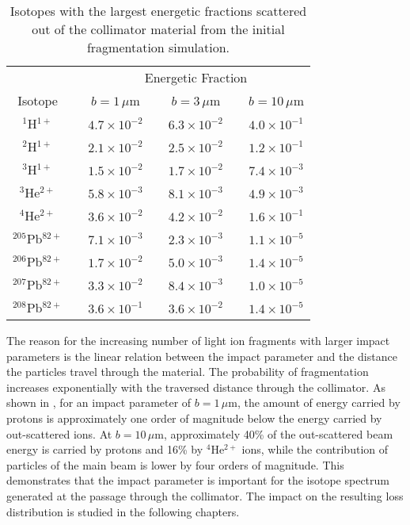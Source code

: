 %
%
\begin{table}[b]
\centering
\caption{Isotopes with the largest energetic fractions scattered out of the collimator material from the initial fragmentation simulation. }
\small
\setlength\tabcolsep{2.5pt}
\label{tab:importance}
\begin{tabular}{ccccccc}
\toprule
          \multicolumn{1}{c}{}     &     &  \multicolumn{5}{c}{Energetic Fraction}                    \\

\multicolumn{1}{c}{Isotope}       &   & \multicolumn{1}{c}{$b=1\,\mu$m} &            & \multicolumn{1}{c}{$b=3\,\mu$m}      &       & \multicolumn{1}{c}{$b=10\,\mu$m}            \\ \midrule
$^1$H$^{1+}$      & \phantom{a} & $4.7 \times 10^{-2}$ & \phantom{a} & $6.3 \times 10^{-2}$ & \phantom{a} & $4.0 \times 10^{-1}$  \\
$^2$H$^{1+}$      &  & $2.1 \times 10^{-2}$ & & $2.5 \times 10^{-2}$ & & $1.2 \times 10^{-1}$  \\
$^3$H$^{1+}$      &  & $1.5 \times 10^{-2}$ & & $1.7 \times 10^{-2}$ & & $7.4 \times 10^{-3}$  \\
$^3$He$^{2+}$     &  & $5.8 \times 10^{-3}$ & & $8.1 \times 10^{-3}$ & & $4.9 \times 10^{-3}$ \\
$^4$He$^{2+}$     &  & $3.6 \times 10^{-2}$ & & $4.2 \times 10^{-2}$ & & $1.6 \times 10^{-1}$  \\
$^{205}$Pb$^{82+}$&  & $7.1 \times 10^{-3}$ & & $2.3 \times 10^{-3}$ & & $1.1 \times 10^{-5}$  \\
$^{206}$Pb$^{82+}$&  & $1.7 \times 10^{-2}$ & & $5.0 \times 10^{-3}$ & & $ 1.4 \times 10^{-5}$ \\
$^{207}$Pb$^{82+}$&  & $3.3 \times 10^{-2}$ & & $ 8.4\times 10^{-3}$ & & $1.0 \times 10^{-5}$  \\
$^{208}$Pb$^{82+}$&  & $3.6 \times 10^{-1}$ & & $3.6\times 10^{-2}$  & & $1.4 \times 10^{-5}$  \\

\bottomrule
\end{tabular}
\end{table}
%
%
%



The reason for the increasing number of light ion fragments with larger impact parameters is the linear relation between the impact parameter and the distance the particles travel through the material. The probability of fragmentation increases exponentially with the traversed distance through the collimator. As shown in , for an impact parameter of $b=1\,\mu$m, the amount of energy carried by protons is approximately one order of magnitude below the energy carried by out-scattered \lead ions. At $b=10\,\mu$m, approximately 40\% of the out-scattered beam energy is carried by protons and 16\% by $^4$He$^{2+}$ ions, while the contribution of particles of the main beam is lower by four orders of magnitude. This demonstrates that the impact parameter is important for the isotope spectrum generated at the passage through the collimator. The impact on the resulting loss distribution is studied in the following chapters.


